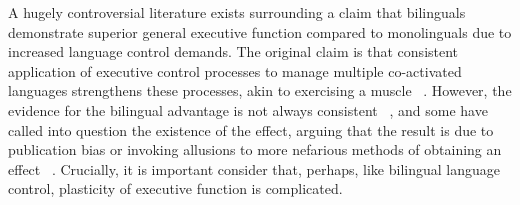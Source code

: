 A hugely controversial literature exists surrounding a claim that bilinguals demonstrate superior general executive function compared to monolinguals due to increased language control demands. The original claim is that consistent application of executive control processes to manage multiple co-activated languages strengthens these processes, akin to exercising a muscle ~\citep{Bialystok2015,Paap2013}. However, the evidence for the bilingual advantage is not always consistent ~\citep{Costa2009,Paap2013}, and some have called into question the existence of the effect, arguing that the result is due to publication bias or invoking allusions to more nefarious methods of obtaining an effect ~\citep{deBruin2015,Paap2013,Paap2014}. Crucially, it is important consider that, perhaps, like bilingual language control, plasticity of executive function is complicated.
